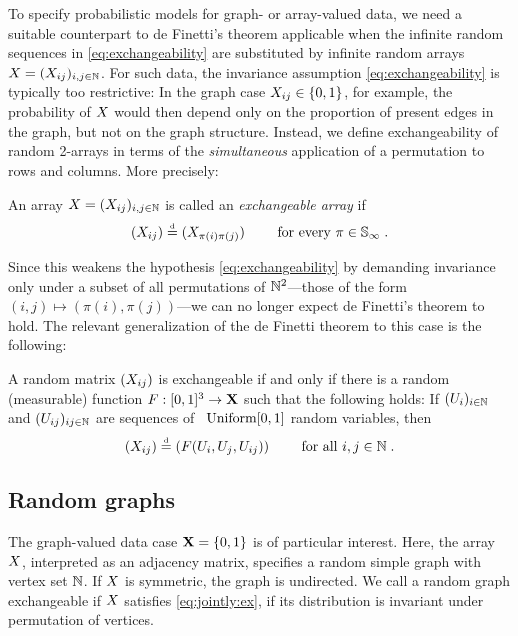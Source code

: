 To specify probabilistic models for graph- or array-valued data, we need a suitable counterpart to de Finetti's theorem applicable when the infinite random sequences in \eqref{eq:exchangeability} are substituted by infinite random arrays $X=(X_{ij})_{i,j\in\mathbb{N}}$.
For such data, the invariance assumption \eqref{eq:exchangeability} is typically too restrictive: In the graph case $X_{ij}\in\lbrace 0,1\rbrace$, for example, the probability of $X$ would then depend only on the proportion of present edges in the graph, but not on the graph structure.
Instead, we define exchangeability of random 2-arrays in terms of the \emph{simultaneous} application of a permutation to rows and columns. More precisely:
\begin{definition}
  An array $X=(X_{ij})_{i,j\in\mathbb{N}}$ is called an \emph{exchangeable array} if 
  \begin{equation}
    \label{eq:jointly:ex}
    (X_{ij})\stackrel{\mbox{\tiny d}}{=}(X_{\pi(i)\pi(j)}) \qquad\text{ for every }\pi\in\mathbb{S}_{\infty}\;.
  \end{equation}
\end{definition}
Since this weakens the hypothesis \eqref{eq:exchangeability} by demanding invariance only under a subset of all permutations of $\mathbb{N}^2$---those of the form $(i,j)\mapsto(\pi(i),\pi(j))$---we can no longer expect de Finetti's theorem to hold.
The relevant generalization of the de Finetti theorem to this case is the following:
\begin{thm}
  \label{theorem:ah}
  A random matrix $(X_{ij})$ is exchangeable if and only if there is a random (measurable) function ${F:[0,1]^3\rightarrow\mathbf{X}}$ such that the following holds: If $(U_i)_{i\in\mathbb{N}}$ and $(U_{ij})_{ij\in\mathbb{N}}$ are \iid sequences of ~$\mbox{\rm Uniform}[0,1]$ random variables, then
  \begin{equation}
    \label{eq:ah}
    (X_{ij})\stackrel{\mbox{\tiny d}}{=} (F(U_i,U_j,U_{ij})) \qquad\text{ for all }i,j\in\mathbb{N}\;.
  \end{equation}
\end{thm}


\subsection{Random graphs}

The graph-valued data case $\mathbf{X}=\lbrace{0,1}\rbrace$ is of particular interest. Here, the array $X$, interpreted as 
an adjacency matrix, specifies a random simple graph with vertex set $\mathbb{N}$. If $X$ is symmetric, the graph is undirected. We call a 
random graph exchangeable if $X$ satisfies \eqref{eq:jointly:ex}, \ie if its distribution is invariant under permutation of vertices.

